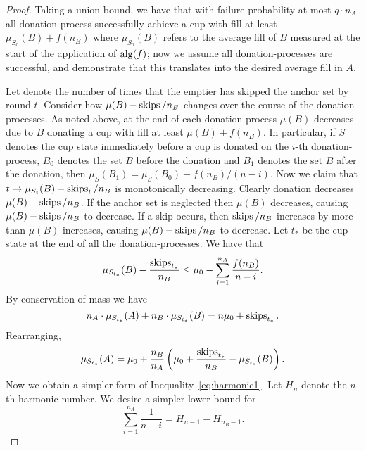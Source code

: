 \begin{proof}
  Taking a union bound, we have that with failure probability at
  most $q \cdot n_A$ all donation-process successfully achieve a cup
  with fill at least $\mu_{S_0}(B) + f(n_B)$ where $\mu_{S_0}(B)$
  refers to the average fill of $B$ measured at the start of the
  application of $\operatorname{\text{\textup{alg}}}(f)$; now we assume all donation-processes
  are successful, and demonstrate that this translates into the
  desired average fill in $A$.

  Let  denote the number of times that the
  emptier has skipped the anchor set by round $t$. Consider how
  $\mu(B) - \operatorname{\text{\textup{skips}}}/n_B$ changes over the course of the donation
  processes. As noted above, at the end of each donation-process
  $\mu(B)$ decreases due to $B$ donating a cup with fill at least
  $\mu(B) + f(n_B)$. In particular, if $S$ denotes the cup state
  immediately before a cup is donated on the $i$-th
  donation-process, $B_0$ denotes the set $B$ before
  the donation and $B_1$ denotes the set $B$ after the donation,
  then $\mu_{S}(B_1) = \mu_{S}(B_0) - f(n_B) / (n-i)$. Now we claim that
  $t\mapsto \mu_{S_t}(B) - \operatorname{\text{\textup{skips}}}_t/n_B$ is monotonically decreasing. 
  Clearly donation decreases $\mu(B) - \operatorname{\text{\textup{skips}}}/n_B$. 
  If the anchor set is neglected then $\mu(B)$ decreases, causing
  $\mu(B) - \operatorname{\text{\textup{skips}}}/n_B$ to decrease. 
  If a skip occurs, then $\operatorname{\text{\textup{skips}}}/n_B$ increases by more than
  $\mu(B)$ increases, causing $\mu(B)-\operatorname{\text{\textup{skips}}}/n_B$ to decrease. 
  Let $t_*$ be the cup state at the end of all the
  donation-processes. We have that 
  \begin{equation}
    \label{eq:harmonic1}
    \mu_{S_{t_*}}(B) - \frac{\operatorname{\text{\textup{skips}}}_{t_*}}{n_B} \le \mu_0 - \sum_{i=1}^{n_A}\frac{f(n_B)}{n-i}.
  \end{equation}
  By conservation of mass we have 
  $$n_A\cdot \mu_{S_{t_*}}(A) + n_B\cdot \mu_{S_{t_*}}(B) = n\mu_0 + \operatorname{\text{\textup{skips}}}_{t_*}.$$
  Rearranging, 
  \begin{equation}
    \label{eq:lowerboundingAharmonic}
    \mu_{S_{t_*}}(A) = \mu_0 + \frac{n_B}{n_A}\left( \mu_0 +
    \frac{\operatorname{\text{\textup{skips}}}_{t_*}}{n_B} - \mu_{S_{t_*}}(B) \right).
  \end{equation}
  Now we obtain a simpler form of
  Inequality~\eqref{eq:harmonic1}. Let $H_n$ denote the $n$-th
  harmonic
  number. We desire a simpler lower bound for 
  $$\sum_{i=1}^{n_A} \frac{1}{n-i} = H_{n-1}-H_{n_B-1}.$$


\end{proof}
